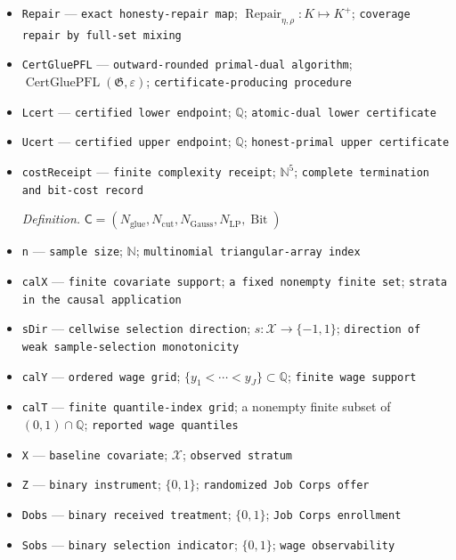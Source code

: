 \documentclass{article}
\begin{document}
\begin{itemize}
  \item \texttt{Repair} --- \texttt{exact honesty-\allowbreak{}repair map}; \(\operatorname{Repair}_{\eta,\rho}:K\mapsto K^{+}\); \texttt{coverage repair by full-\allowbreak{}set mixing}
  \item \texttt{CertGluePFL} --- \texttt{outward-\allowbreak{}rounded primal-\allowbreak{}dual algorithm}; \(\operatorname{CertGluePFL}(\mathfrak G,\varepsilon)\); \texttt{certificate-\allowbreak{}producing procedure}
  \item \texttt{Lcert} --- \texttt{certified lower endpoint}; \(\mathbb Q\); \texttt{atomic-\allowbreak{}dual lower certificate}
  \item \texttt{Ucert} --- \texttt{certified upper endpoint}; \(\mathbb Q\); \texttt{honest-\allowbreak{}primal upper certificate}
  \item \texttt{costReceipt} --- \texttt{finite complexity receipt}; \(\mathbb N^5\); \texttt{complete termination and bit-\allowbreak{}cost record}
  \par\smallskip\noindent\emph{Definition.} \(\mathsf C=(N_{\mathrm{glue}},N_{\mathrm{cut}},N_{\mathrm{Gauss}},N_{\mathrm{LP}},\operatorname{Bit})\)
  \item \texttt{n} --- \texttt{sample size}; \(\mathbb N\); \texttt{multinomial triangular-\allowbreak{}array index}
  \item \texttt{calX} --- \texttt{finite covariate support}; \texttt{a fixed nonempty finite set}; \texttt{strata in the causal application}
  \item \texttt{sDir} --- \texttt{cellwise selection direction}; \(s:\mathcal X\to\{-1,1\}\); \texttt{direction of weak sample-\allowbreak{}selection monotonicity}
  \item \texttt{calY} --- \texttt{ordered wage grid}; \(\{y_1<\cdots<y_J\}\subset\mathbb Q\); \texttt{finite wage support}
  \item \texttt{calT} --- \texttt{finite quantile-\allowbreak{}index grid}; a nonempty finite subset of \((0,1)\cap\mathbb Q\); \texttt{reported wage quantiles}
  \item \texttt{X} --- \texttt{baseline covariate}; \(\mathcal X\); \texttt{observed stratum}
  \item \texttt{Z} --- \texttt{binary instrument}; \(\{0,1\}\); \texttt{randomized Job Corps offer}
  \item \texttt{Dobs} --- \texttt{binary received treatment}; \(\{0,1\}\); \texttt{Job Corps enrollment}
  \item \texttt{Sobs} --- \texttt{binary selection indicator}; \(\{0,1\}\); \texttt{wage observability}

\end{itemize}
\end{document}
